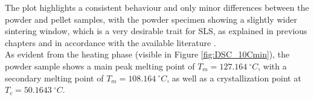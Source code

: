 \documentclass{article}
\begin{document}
%
%
%

        \clearpage

        The plot highlights a consistent behaviour  and only 
        minor differences between the powder and pellet samples, with the powder specimen showing a slightly wider 
        sintering window, which is a very desirable trait for SLS, as explained in 
        previous chapters and in accordance with 
        the available literature \autocites{Eraslan_PHBH_review,doi:10.1063/1.4918516,DechetMaximilianA2020OtDo}. \\    
        
        As evident from the heating phase (visible in Figure \ref{fig:DSC_10Cmin}), the powder sample shows a main peak melting point of $T_{m} =  127.164 \ ^{\circ}C$, with 
        a secondary melting point of $T_{m} =  108.164 \ ^{\circ}C$, as well as a crystallization point at $T_{c} =  50.1643 \ ^{\circ}C$. 
\end{document}
